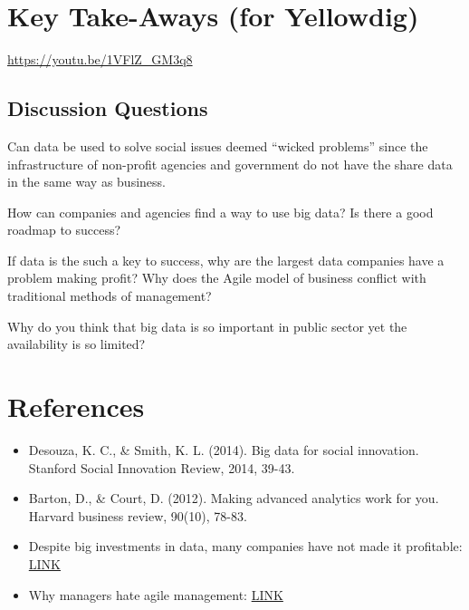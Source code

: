 \documentclass[]{book}
\providecommand{\tightlist}{%
  \setlength{\itemsep}{0pt}\setlength{\parskip}{0pt}}
\theoremstyle{definition}
\theoremstyle{definition}
\theoremstyle{definition}
\theoremstyle{remark}
\begin{document}
\hypertarget{key-take-aways-for-yellowdig-2}{%
\section{Key Take-Aways (for
Yellowdig)}\label{key-take-aways-for-yellowdig-2}}

\url{https://youtu.be/1VFlZ_GM3q8}

\hypertarget{discussion-questions-2}{%
\subsection{Discussion Questions}\label{discussion-questions-2}}

Can data be used to solve social issues deemed ``wicked problems'' since
the infrastructure of non-profit agencies and government do not have the
share data in the same way as business.

How can companies and agencies find a way to use big data? Is there a
good roadmap to success?

If data is the such a key to success, why are the largest data companies
have a problem making profit? Why does the Agile model of business
conflict with traditional methods of management?

Why do you think that big data is so important in public sector yet the
availability is so limited?

\hypertarget{references-2}{%
\section{References}\label{references-2}}

\begin{itemize}
\tightlist
\item
  Desouza, K. C., \& Smith, K. L. (2014). Big data for social
  innovation. Stanford Social Innovation Review, 2014, 39-43.\\
\item
  Barton, D., \& Court, D. (2012). Making advanced analytics work for
  you. Harvard business review, 90(10), 78-83.\\
\item
  Despite big investments in data, many companies have not made it
  profitable:
  \href{https://www.theregister.co.uk/2017/06/07/go_small_on_big_data/}{LINK}\\
\item
  Why managers hate agile management:
  \href{https://www.forbes.com/sites/stevedenning/2015/01/28/more-on-why-managers-hate-agile/\#186ce9f010ea}{LINK}
\end{itemize}
\end{document}
